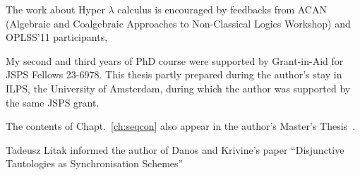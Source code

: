 \begin{acknowledge}
The work about Hyper $\lambda$ calculus is encouraged by feedbacks from
ACAN (Algebraic and
Coalgebraic
Approaches to
Non-Classical Logics Workshop) and OPLSS'11 participants,

My second and third years of PhD course were
supported by Grant-in-Aid for JSPS Fellows 23-6978.
This thesis partly prepared during the author's stay in
ILPS, the University of Amsterdam, during which the author was supported
 by the same JSPS grant.

 The contents of Chapt.~\ref{ch:seqcon} also appear in the author's
 Master's Thesis~\citep{hiraimaster}.

 Tadeusz Litak informed the author of Danos and Krivine's paper
 ``Disjunctive Tautologies as Synchronisation Schemes''
\end{acknowledge}
